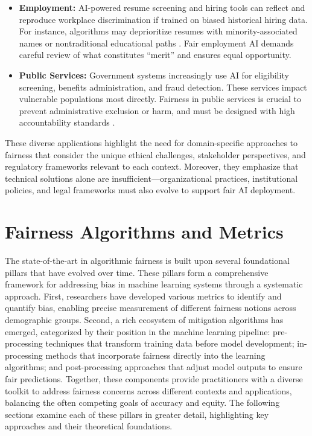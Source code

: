 \documentclass[12pt,a4paper,openright,twoside]{book}
\begin{document}
\begin{itemize}
    \item \textbf{Employment:} AI-powered resume screening and hiring tools can reflect and reproduce workplace discrimination if trained on biased historical hiring data. For instance, algorithms may deprioritize resumes with minority-associated names or nontraditional educational paths \cite{Chen2023}. Fair employment AI demands careful review of what constitutes “merit” and ensures equal opportunity.
    
    \item \textbf{Public Services:} Government systems increasingly use AI for eligibility screening, benefits administration, and fraud detection. These services impact vulnerable populations most directly. Fairness in public services is crucial to prevent administrative exclusion or harm, and must be designed with high accountability standards \cite{suresh2021framework}.
\end{itemize}

These diverse applications highlight the need for domain-specific approaches to fairness that consider the unique ethical challenges, stakeholder perspectives, and regulatory frameworks relevant to each context. Moreover, they emphasize that technical solutions alone are insufficient—organizational practices, institutional policies, and legal frameworks must also evolve to support fair AI deployment.


\section{Fairness Algorithms and Metrics}
The state-of-the-art in algorithmic fairness is built upon several foundational pillars that have evolved over time. These pillars form a comprehensive framework for addressing bias in machine learning systems through a systematic approach. First, researchers have developed various metrics to identify and quantify bias, enabling precise measurement of different fairness notions across demographic groups. Second, a rich ecosystem of mitigation algorithms has emerged, categorized by their position in the machine learning pipeline: pre-processing techniques that transform training data before model development; in-processing methods that incorporate fairness directly into the learning algorithms; and post-processing approaches that adjust model outputs to ensure fair predictions. Together, these components provide practitioners with a diverse toolkit to address fairness concerns across different contexts and applications, balancing the often competing goals of accuracy and equity. The following sections examine each of these pillars in greater detail, highlighting key approaches and their theoretical foundations.
\end{document}
